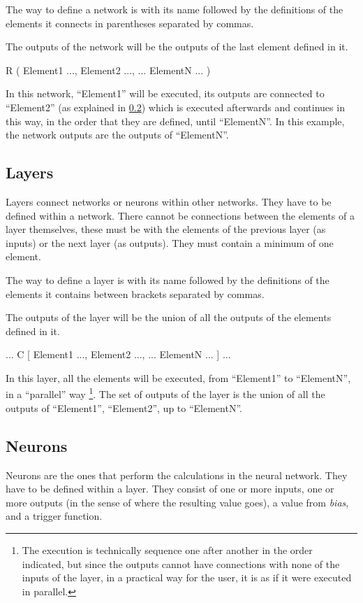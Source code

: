 \documentclass[a4paper]{article}
\begin{document}
The way to define a network is with its name followed by the definitions of the elements it connects in parentheses separated by commas.

The outputs of the network will be the outputs of the last element defined in it.

\begin{codebox}
R (
	Element1 ...,
	Element2 ...,
	...
	ElementN ...
)
\end{codebox}

In this network, ``Element1'' will be executed, its outputs are connected to ``Element2'' (as explained in \ref{neuronas}) which is executed afterwards and continues in this way, in the order that they are defined, until ``ElementN''. In this example, the network outputs are the outputs of ``ElementN''.

\subsection{Layers}
Layers connect networks or neurons within other networks. They have to be defined within a network. There cannot be connections between the elements of a layer themselves, these must be with the elements of the previous layer (as inputs) or the next layer (as outputs). They must contain a minimum of one element.

The way to define a layer is with its name followed by the definitions of the elements it contains between brackets separated by commas.

The outputs of the layer will be the union of all the outputs of the elements defined in it.

\begin{codebox}
...
C [
	Element1 ...,
	Element2 ...,
	...
	ElementN ...
]
...
\end{codebox}

In this layer, all the elements will be executed, from ``Element1'' to ``ElementN'', in a ``parallel'' way \footnote{The execution is technically sequence one after another in the order indicated, but since the outputs cannot have connections with none of the inputs of the layer, in a practical way for the user, it is as if it were executed in parallel.}. The set of outputs of the layer is the union of all the outputs of ``Element1'', ``Element2'', up to ``ElementN''.

\subsection{Neurons} \label{neuronas}
Neurons are the ones that perform the calculations in the neural network. They have to be defined within a layer. They consist of one or more inputs, one or more outputs (in the sense of where the resulting value goes), a value from \textit{bias}, and a trigger function.
\end{document}
